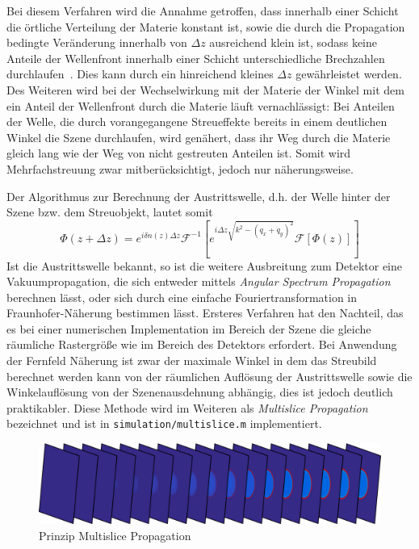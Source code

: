 Bei diesem Verfahren wird die Annahme getroffen, dass  innerhalb einer Schicht die örtliche Verteilung der Materie konstant ist, sowie die durch die Propagation bedingte Veränderung innerhalb von $\Delta z$ ausreichend klein ist, sodass keine Anteile der Wellenfront innerhalb einer Schicht unterschiedliche Brechzahlen durchlaufen~\cite{hare1994}. Dies kann durch ein hinreichend kleines $\Delta z$ gewährleistet werden. 
Des Weiteren wird bei der Wechselwirkung mit der Materie der Winkel mit dem ein Anteil der Wellenfront durch die Materie läuft vernachlässigt: Bei Anteilen der Welle, die durch vorangegangene Streueffekte bereits in einem deutlichen Winkel die Szene durchlaufen, wird genähert, dass ihr Weg durch die Materie gleich lang wie der Weg von nicht gestreuten Anteilen ist. Somit wird Mehrfachstreuung zwar mitberücksichtigt, jedoch nur näherungsweise.
	
Der Algorithmus zur Berechnung der Austrittswelle, d.h. der Welle hinter der Szene bzw. dem Streuobjekt, lautet somit
\begin{equation}
	\label{eq:multislice}
	\Phi(z+\Delta z)= e^{i\delta n\left(z\right) \Delta z}\mathscr{F}^{-1}\left[e^{i\Delta z\sqrt{k^2-(q_x+q_y)^2}}\mathscr{F}\left[\Phi(z)\right]\right]
\end{equation}
Ist die Austrittswelle bekannt, so ist die weitere Ausbreitung zum Detektor eine Vakuumpropagation, die sich entweder mittels \textit{Angular Spectrum Propagation} berechnen lässt, oder sich durch eine einfache Fouriertransformation in Fraunhofer-Näherung bestimmen lässt. Ersteres Verfahren hat den Nachteil, das es bei einer numerischen Implementation im Bereich der Szene die gleiche räumliche Rastergröße wie im Bereich des Detektors erfordert. Bei Anwendung der Fernfeld Näherung ist zwar der maximale Winkel in dem das Streubild berechnet werden kann von der räumlichen Auflösung der Austrittswelle sowie die Winkelauflösung von der Szenenausdehnung abhängig, dies ist jedoch deutlich praktikabler.
Diese Methode wird im Weiteren als \textit{Multislice Propagation} bezeichnet und ist in \texttt{simulation/multislice.m} implementiert.

\begin{figure}
	\centering
	\includegraphics[width=1\textwidth]{images/slice_multislice.png}
	\caption[Prinzip MSFT]{Prinzip Multislice Propagation}
	\label{fig:msft}
\end{figure} 
	
